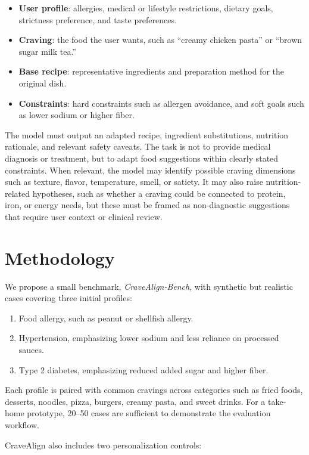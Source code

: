 \documentclass[11pt]{article}
\begin{document}
\begin{itemize}[leftmargin=*]
    \item \textbf{User profile}: allergies, medical or lifestyle restrictions, dietary goals, strictness preference, and taste preferences.
    \item \textbf{Craving}: the food the user wants, such as ``creamy chicken pasta'' or ``brown sugar milk tea.''
    \item \textbf{Base recipe}: representative ingredients and preparation method for the original dish.
    \item \textbf{Constraints}: hard constraints such as allergen avoidance, and soft goals such as lower sodium or higher fiber.
\end{itemize}

The model must output an adapted recipe, ingredient substitutions, nutrition rationale, and relevant safety caveats. The task is not to provide medical diagnosis or treatment, but to adapt food suggestions within clearly stated constraints. When relevant, the model may identify possible craving dimensions such as texture, flavor, temperature, smell, or satiety. It may also raise nutrition-related hypotheses, such as whether a craving could be connected to protein, iron, or energy needs, but these must be framed as non-diagnostic suggestions that require user context or clinical review.

\section{Methodology}
We propose a small benchmark, \textit{CraveAlign-Bench}, with synthetic but realistic cases covering three initial profiles:

\begin{enumerate}[leftmargin=*]
    \item Food allergy, such as peanut or shellfish allergy.
    \item Hypertension, emphasizing lower sodium and less reliance on processed sauces.
    \item Type 2 diabetes, emphasizing reduced added sugar and higher fiber.
\end{enumerate}

Each profile is paired with common cravings across categories such as fried foods, desserts, noodles, pizza, burgers, creamy pasta, and sweet drinks. For a take-home prototype, 20--50 cases are sufficient to demonstrate the evaluation workflow.

CraveAlign also includes two personalization controls:
\end{document}
